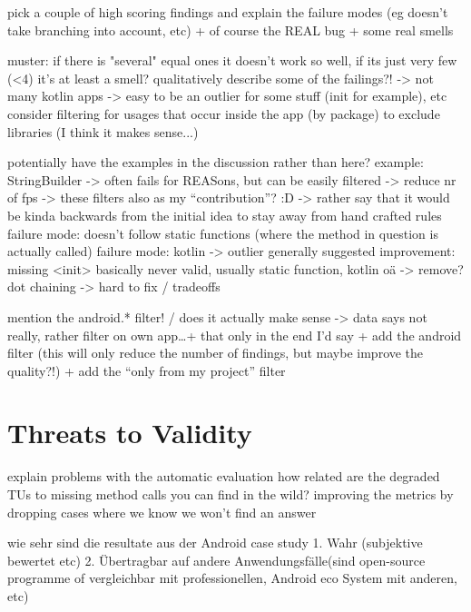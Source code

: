 pick a couple of high scoring findings and explain the failure modes (eg doesn't take branching into account, etc)
+ of course the REAL bug + some real smells

muster: if there is "several" equal ones it doesn't work so well, if its just very few (<4) it's at least a smell?
qualitatively describe some of the failings?! -> not many kotlin apps -> easy to be an outlier for some stuff (init for example), etc
consider filtering for usages that occur inside the app (by package) to exclude libraries (I think it makes sense...)

potentially have the examples in the discussion rather than here?
example: StringBuilder -> often fails for REASons, but can be easily filtered -> reduce nr of fps
-> these filters also as my ``contribution''? :D -> rather say that it would be kinda backwards from the initial idea to stay away from hand crafted rules
failure mode: doesn't follow static functions (where the method in question is actually called)
failure mode: kotlin -> outlier generally
suggested improvement: missing <init> basically never valid, usually static function, kotlin oä -> remove?
dot chaining -> hard to fix / tradeoffs

mention the android.* filter! / does it actually make sense -> data says not really, rather filter on own app\ldots + that only in the end I'd say
+ add the android filter (this will only reduce the number of findings, but maybe improve the quality?!)
+ add the ``only from my project'' filter


\section{Threats to Validity}

explain problems with the automatic evaluation
how related are the degraded TUs to missing method calls you can find in the wild?
improving the metrics by dropping cases where we know we won't find an answer

wie sehr sind die resultate aus der Android case study 1. Wahr (subjektive bewertet etc) 2. Übertragbar auf andere Anwendungsfälle(sind open-source programme of vergleichbar mit professionellen, Android eco System mit anderen, etc)
